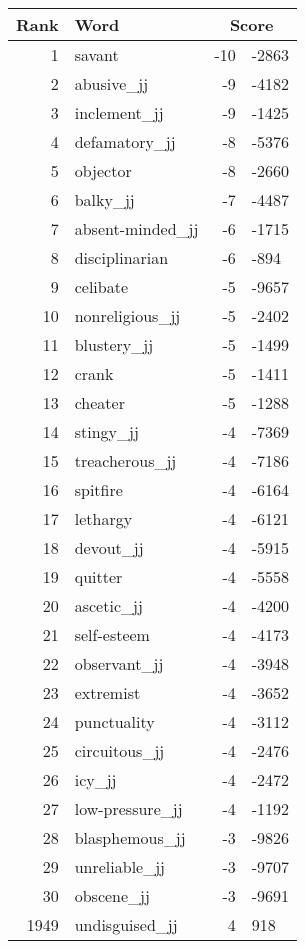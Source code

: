 \begin{longtable}[!htbp]{| rlr@{.}l |}
    \hline
    \textbf{Rank} & \textbf{Word} & \multicolumn{2}{c|}{\textbf{Score}} \\
    \hline
    \endhead
    1 & savant & -10 & -2863 \\
    2 & abusive\_jj & -9 & -4182 \\
    3 & inclement\_jj & -9 & -1425 \\
    4 & defamatory\_jj & -8 & -5376 \\
    5 & objector & -8 & -2660 \\
    6 & balky\_jj & -7 & -4487 \\
    7 & absent-minded\_jj & -6 & -1715 \\
    8 & disciplinarian & -6 & -894 \\
    9 & celibate & -5 & -9657 \\
    10 & nonreligious\_jj & -5 & -2402 \\
    11 & blustery\_jj & -5 & -1499 \\
    12 & crank & -5 & -1411 \\
    13 & cheater & -5 & -1288 \\
    14 & stingy\_jj & -4 & -7369 \\
    15 & treacherous\_jj & -4 & -7186 \\
    16 & spitfire & -4 & -6164 \\
    17 & lethargy & -4 & -6121 \\
    18 & devout\_jj & -4 & -5915 \\
    19 & quitter & -4 & -5558 \\
    20 & ascetic\_jj & -4 & -4200 \\
    21 & self-esteem & -4 & -4173 \\
    22 & observant\_jj & -4 & -3948 \\
    23 & extremist & -4 & -3652 \\
    24 & punctuality & -4 & -3112 \\
    25 & circuitous\_jj & -4 & -2476 \\
    26 & icy\_jj & -4 & -2472 \\
    27 & low-pressure\_jj & -4 & -1192 \\
    28 & blasphemous\_jj & -3 & -9826 \\
    29 & unreliable\_jj & -3 & -9707 \\
    30 & obscene\_jj & -3 & -9691 \\
    1949 & undisguised\_jj & 4 & 918 \\

\end{longtable}
